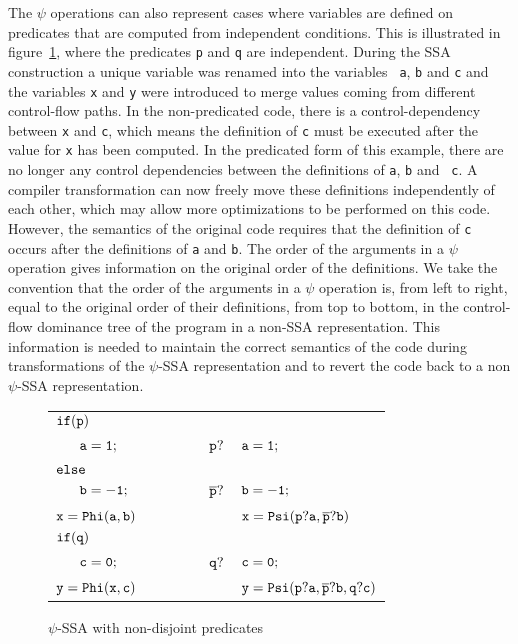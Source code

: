 The $\psi$ operations can also represent cases where variables are
defined on predicates that are computed from independent
conditions. This is illustrated in figure~\ref{fig:non_disjoint_pred},
where the predicates {\tt p} and {\tt q} are independent. During the
SSA construction a unique variable was renamed into the variables {\tt
  a}, {\tt b} and {\tt c} and the variables {\tt x} and {\tt y} were
introduced to merge values coming from different control-flow
paths. In the non-predicated code, there is a control-dependency
between {\tt x} and {\tt c}, which means the definition of {\tt c}
must be executed after the value for {\tt x} has been computed. In the
predicated form of this example, there are no longer any control
dependencies between the definitions of {\tt a}, {\tt b} and {\tt
  c}. A compiler transformation can now freely move these definitions
independently of each other, which may allow more optimizations to be
performed on this code. However, the semantics of the original code
requires that the definition of {\tt c} occurs after the definitions
of {\tt a} and {\tt b}. The order of the arguments in a $\psi$
operation gives information on the original order of the definitions.
We take the convention that the order of the arguments in a $\psi$
operation is, from left to right, equal to the original order of their
definitions, from top to bottom, in the control-flow dominance tree of
the program in a non-SSA representation. This information is needed to
maintain the correct semantics of the code during transformations of
the $\psi$-SSA representation and to revert the code back to a non
$\psi$-SSA representation.


\begin{figure}
\begin{center}
\footnotesize
\begin{tabular}{llll}
${\tt if (p)}$        & & &\\
${\tt\ \ \ \ \ a = 1;}$ & \ \ \ \ \  & ${\tt p?}$ & ${\tt a = 1;}$ \\
${\tt else}$          & & & \\
${\tt\ \ \ \ \     b = -1;}$ & \ \ \ \ \  & ${\tt \overline{p}?}$ & ${\tt b = -1;}$ \\
${\tt x = Phi(a, b)}$ & & & ${\tt x = Psi(p?a, \overline{p}?b)}$ \\
${\tt if (q)}$        & & &\\
${\tt\ \ \ \ \ c = 0;}$ & \ \ \ \ \  & ${\tt q?}$ & ${\tt c = 0;}$ \\
${\tt y = Phi(x, c)}$ & & & ${\tt y = Psi(p?a, \overline{p}?b, q?c)}$ \\
\end{tabular}
\caption{$\psi$-SSA with non-disjoint predicates}
\label{fig:non_disjoint_pred}
\end{center}
\end{figure}


